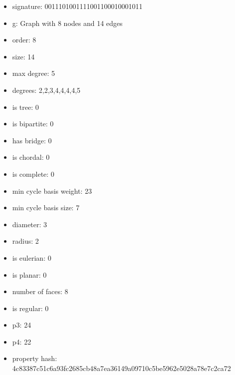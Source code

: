 \begin{itemize}
\item signature: 0011101001111001100010001011
\item g: Graph with 8 nodes and 14 edges
\item order: 8
\item size: 14
\item max degree: 5
\item degrees: 2,2,3,4,4,4,4,5
\item is tree: 0
\item is bipartite: 0
\item has bridge: 0
\item is chordal: 0
\item is complete: 0
\item min cycle basis weight: 23
\item min cycle basis size: 7
\item diameter: 3
\item radius: 2
\item is eulerian: 0
\item is planar: 0
\item number of faces: 8
\item is regular: 0
\item p3: 24
\item p4: 22
\item property hash: 4c83387c51c6a93fc2685cb48a7ea36149a09710c5be5962e5028a78e7c2ca72
\end{itemize}
\newpage
\begin{figure}
\end{figure}
